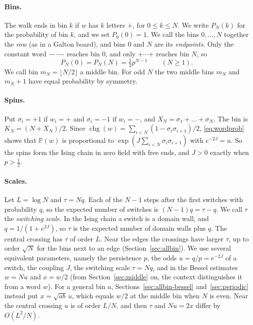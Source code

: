 \documentclass[11pt]{article}
\theoremstyle{definition}
\theoremstyle{remark}
\newcommand{\Prob}{\mathbb{P}}
\newcommand{\chg}{\operatorname{chg}}
\newcommand{\sR}{\mathord{+}}
\newcommand{\sL}{\mathord{-}}
\begin{document}
\paragraph{Bins.} The walk ends in bin $k$ if $w$ has $k$ letters $\sR$, for
$0\le k\le N$. We write $P_N(k)$ for the probability of bin $k$, and we set $P_0(0)=1$.
We call the bins $0,\dots,N$ together the \emph{row} (as in a Galton board), and bins
$0$ and $N$ are its \emph{endpoints}. Only the constant word
$\sL\cdots\sL$ reaches bin $0$, and only $\sR\cdots\sR$ reaches bin $N$, so
\[
P_N(0)=P_N(N)=\tfrac12p^{N-1}\qquad(N\ge1).
\]
We call bin $m_N=\lfloor N/2\rfloor$ a middle bin. For odd $N$ the two middle
bins $m_N$ and $m_N+1$ have equal probability by symmetry.

\paragraph{Spins.} Put $\sigma_i=+1$ if $w_i=\sR$ and $\sigma_i=-1$ if
$w_i=\sL$, and $X_N=\sigma_1+\dots+\sigma_N$. The bin is $K_N=(N+X_N)/2$. Since
$\chg(w)=\sum_{i<N}(1-\sigma_i\sigma_{i+1})/2$, \eqref{eq:wordprob}
shows that $\Prob(w)$ is proportional to
$\exp(J\sum_{i<N}\sigma_i\sigma_{i+1})$ with $e^{-2J}=u$. So the
spins form the Ising chain in zero field with free ends, and $J>0$
exactly when $p>\frac12$.

\paragraph{Scales.} Let $L=\log N$ and $\tau=Nq$. Each of the $N-1$ steps after
the first switches with probability $q$, so the expected number of switches is
$(N-1)q=\tau-q$. We call $\tau$ the \emph{switching scale}. In the Ising chain a switch is a domain wall, and
$q=1/(1+e^{2J})$, so $\tau$ is the expected number of domain walls plus $q$. The central crossing has
$\tau$ of order $L$. Near the edges the crossings have larger $\tau$, up to order
$\sqrt N$ for the bins next to an edge (Section~\ref{sec:allbin}).
We use several equivalent parameters, namely the persistence $p$, the odds
$u=q/p=e^{-2J}$ of a switch, the coupling $J$, the switching scale $\tau=Nq$,
and in the Bessel estimates $w=Nu$ and $x=w/2$ (from Section~\ref{sec:middle} on,
the context distinguishes it from a word $w$). For a general bin $a$,
Sections~\ref{sec:allbin-bessel} and~\ref{sec:periodic} instead put
$x=\sqrt{ab}\,u$, which equals $w/2$ at the middle bin when $N$ is even. Near the central crossing
$u$ is of order $L/N$, and then $\tau$ and $Nu=2x$ differ by $O(L^2/N)$.
\end{document}
